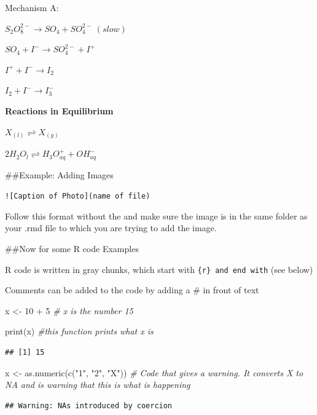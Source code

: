 \documentclass[
]{article}
\newenvironment{Shaded}{\begin{snugshade}}{\end{snugshade}}
\newcommand{\CommentTok}[1]{\textcolor[rgb]{0.56,0.35,0.01}{\textit{#1}}}
\newcommand{\DecValTok}[1]{\textcolor[rgb]{0.00,0.00,0.81}{#1}}
\newcommand{\FunctionTok}[1]{\textcolor[rgb]{0.00,0.00,0.00}{#1}}
\newcommand{\NormalTok}[1]{#1}
\newcommand{\OtherTok}[1]{\textcolor[rgb]{0.56,0.35,0.01}{#1}}
\newcommand{\SpecialCharTok}[1]{\textcolor[rgb]{0.00,0.00,0.00}{#1}}
\newcommand{\StringTok}[1]{\textcolor[rgb]{0.31,0.60,0.02}{#1}}
\begin{document}
Mechanism A:

\(S_{2}O_{8}^{2-} \rightarrow SO_{4} + SO_{4}^{2-} \: (slow)\)

\(SO_{4} + I^{-} \rightarrow SO_{4}^{2-} + I^{+}\)

\(I^{+} + I^{-} \rightarrow I_{2}\)

\(I_{2} + I^{-} \rightarrow I_{3}^{-}\)

\textbf{Reactions in Equilibrium}

\(X_{(l)} \rightleftharpoons X_{(g)}\)

\(2H_{2}O_{l} \rightleftharpoons H_{3}O^{+}_{aq} + OH^{-}_{aq}\)

\#\#Example: Adding Images

\texttt{!{[}Caption\ of\ Photo{]}(name\ of\ file)}

Follow this format without the \texttt{} and make sure the image is in
the same folder as your .rmd file to which you are trying to add the
image.

\#\#Now for some R code Examples

R code is written in gray chunks, which start with
\texttt{\{r\}\ and\ end\ with} (see below)

Comments can be added to the code by adding a \# in front of text

\begin{Shaded}
\begin{Highlighting}[]
\NormalTok{x }\OtherTok{\textless{}{-}} \DecValTok{10} \SpecialCharTok{+} \DecValTok{5} \CommentTok{\# x is the number 15}

\FunctionTok{print}\NormalTok{(x) }\CommentTok{\#this function prints what x is}
\end{Highlighting}
\end{Shaded}

\begin{verbatim}
## [1] 15
\end{verbatim}

\begin{Shaded}
\begin{Highlighting}[]
\NormalTok{x }\OtherTok{\textless{}{-}} \FunctionTok{as.numeric}\NormalTok{(}\FunctionTok{c}\NormalTok{(}\StringTok{"1"}\NormalTok{, }\StringTok{"2"}\NormalTok{, }\StringTok{"X"}\NormalTok{)) }\CommentTok{\# Code that gives a warning. It converts X to NA and is warning that this is what is happening}
\end{Highlighting}
\end{Shaded}

\begin{verbatim}
## Warning: NAs introduced by coercion
\end{verbatim}
\end{document}
